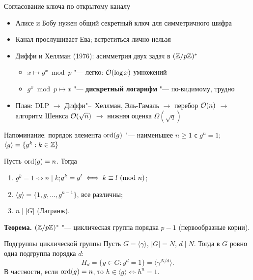 \documentclass{ca-slides}
\author{}
\begin{document}
\titleframe

\begin{canvasframe}{Согласование ключа по открытому каналу}
  \begin{itemize}
    \item Алисе и Бобу нужен общий секретный ключ для симметричного шифра
    \item Канал прослушивает Ева; встретиться лично нельзя
    \item Диффи и Хеллман (1976): асимметрия двух задач в $(\mathbb{Z}/p\mathbb{Z})^{*}$
    \begin{itemize}
      \item $x \mapsto g^x \bmod p$ "--- легко: $\mathcal{O}(\log x)$ умножений
      \item $g^x \bmod p \mapsto x$ "--- \textbf{дискретный логарифм} "--- по-видимому, трудно
    \end{itemize}
    \item План: DLP $\to$ Диффи"--~Хеллман, Эль-Гамаль $\to$ перебор $\mathcal{O}(n)$ $\to$
      алгоритм Шенкса $\mathcal{O}(\sqrt n)$ $\to$ нижняя оценка $\Omega(\sqrt q)$
  \end{itemize}
\end{canvasframe}

\begin{canvasframe}{Напоминание: порядок элемента}
  $\operatorname{ord}(g)$ "--- наименьшее $n \ge 1$ с $g^n = 1$;\quad
  $\langle g \rangle = \{g^k : k \in \mathbb{Z}\}$
  \begin{proposition}
    Пусть $\operatorname{ord}(g) = n$. Тогда
    \begin{enumerate}
      \item $g^k = 1 \iff n \mid k$;\quad $g^k = g^l \iff k \equiv l\ (\mathrm{mod}\ n)$;
      \item $\langle g \rangle = \{1, g, \dots, g^{n-1}\}$, все различны;
      \item $n \mid |G|$ (Лагранж).
    \end{enumerate}
  \end{proposition}
  \textbf{Теорема.} $(\mathbb{Z}/p\mathbb{Z})^{*}$ "--- циклическая группа порядка $p - 1$ (первообразные корни).
\end{canvasframe}

\begin{theoremframe}[proposition]{Подгруппы циклической группы}
  Пусть $G = \langle \gamma \rangle$, $|G| = N$, $d \mid N$. Тогда в $G$ ровно одна подгруппа
  порядка $d$:
  \[
    H_d = \{y \in G : y^d = 1\} = \langle \gamma^{N/d} \rangle .
  \]
  В частности, если $\operatorname{ord}(g) = n$, то $h \in \langle g \rangle \iff h^n = 1$.
\end{theoremframe}
\end{document}
